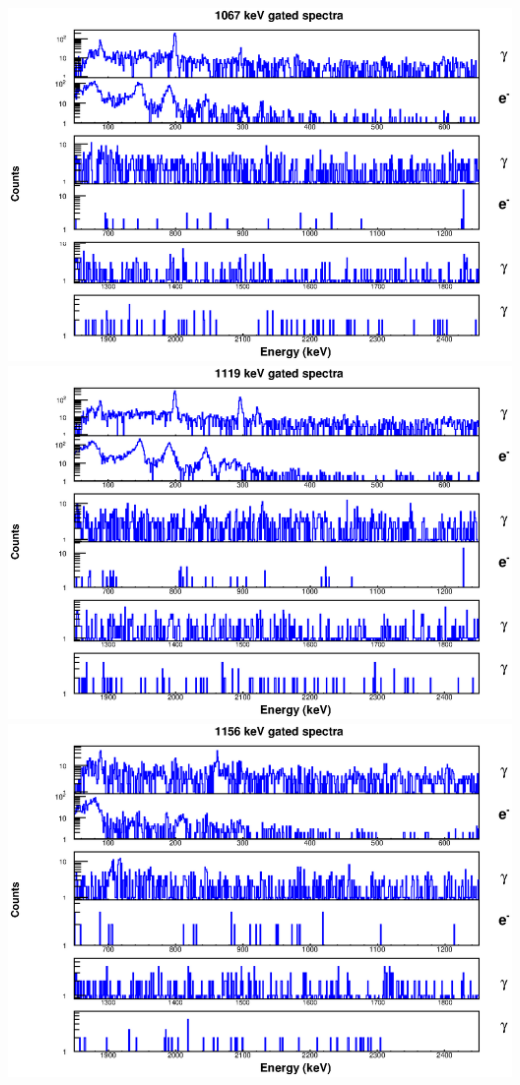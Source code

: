 \begin{landscape}
\includegraphics[scale=1.1]{156Gd_Appendix/1067_combined.eps}
\includegraphics[scale=1.1]{156Gd_Appendix/1119_combined.eps}
\includegraphics[scale=1.1]{156Gd_Appendix/1156_combined.eps}

\end{landscape}
